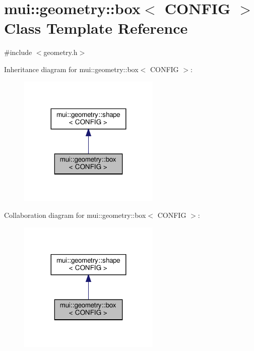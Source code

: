 \hypertarget{classmui_1_1geometry_1_1box}{}\section{mui\+:\+:geometry\+:\+:box$<$ C\+O\+N\+F\+IG $>$ Class Template Reference}
\label{classmui_1_1geometry_1_1box}


{\ttfamily \#include $<$geometry.\+h$>$}



Inheritance diagram for mui\+:\+:geometry\+:\+:box$<$ C\+O\+N\+F\+IG $>$\+:
\nopagebreak
\begin{figure}[H]
\begin{center}
\leavevmode
\includegraphics[width=191pt]{classmui_1_1geometry_1_1box__inherit__graph}
\end{center}
\end{figure}


Collaboration diagram for mui\+:\+:geometry\+:\+:box$<$ C\+O\+N\+F\+IG $>$\+:
\nopagebreak
\begin{figure}[H]
\begin{center}
\leavevmode
\includegraphics[width=191pt]{classmui_1_1geometry_1_1box__coll__graph}
\end{center}
\end{figure}
